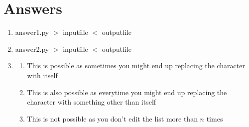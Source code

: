 \documentclass[12pt]{article}
\begin{document}
\maketitle

\section*{Answers}

\begin{enumerate}
\item answer1.py $>$ inputfile $<$ outputfile
\item answer2.py $>$ inputfile $<$ outputfile
\item 
\begin{enumerate}[label=(\alph*)]
        \item This is possible as sometimes you might end up replacing the character with itself
        \item This is also possible as everytime you might end up replacing the character with something other than itself
        \item This is not possible as you don't edit the list more than $n$ times
        

\end{enumerate}
\end{enumerate}
\end{document}
